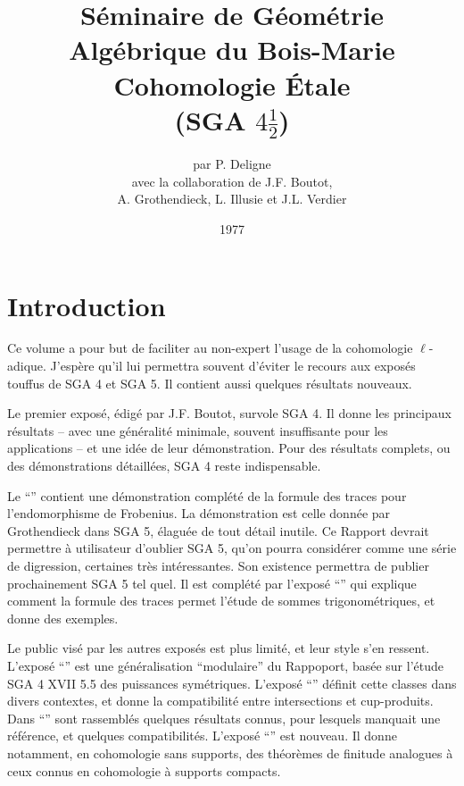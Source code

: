 \documentclass[oneside]{book}
\title{Séminaire de Géométrie Algébrique du Bois-Marie \\ \vspace{20pt}
Cohomologie Étale \\ \vspace{20pt}
(SGA $4\frac 1 2$)}
\author{par P. Deligne \vspace{10pt}\\ 
avec la collaboration de J.F. Boutot, \\ A. Grothendieck, L. Illusie et J.L. Verdier}
\date{1977}
\begin{document}
\maketitle












\chapter*{Introduction}

Ce volume a pour but de faciliter au non-expert l'usage de la 
cohomologie $\ell$-adique. J'espère qu'il lui permettra souvent d'éviter le 
recours aux exposés touffus de SGA 4 et SGA 5. Il contient aussi quelques 
résultats nouveaux. 

Le premier exposé, édigé par J.F. Boutot, survole SGA 4. Il donne les 
principaux résultats -- avec une généralité minimale, souvent 
insuffisante pour les applications -- et une idée de leur démonstration. Pour 
des résultats complets, ou des démonstrations détaillées, SGA 4 reste 
indispensable. 

Le ``'' contient une démonstration complété de 
la formule des traces pour l'endomorphisme de Frobenius. La démonstration est 
celle donnée par Grothendieck dans SGA 5, élaguée de tout détail inutile. Ce 
Rapport devrait permettre à utilisateur d'oublier SGA 5, qu'on pourra 
considérer comme une série de digression, certaines très intéressantes. Son 
existence permettra de publier prochainement SGA 5 tel quel. Il est complété 
par l'exposé ``'' qui explique comment la formule des traces permet 
l'étude de sommes trigonométriques, et donne des exemples. 

Le public visé par les autres exposés est plus limité, et leur style s'en 
ressent. L'exposé ``'' est une 
généralisation ``modulaire'' du Rappoport, basée sur l'étude SGA 4 XVII 5.5 des 
puissances symétriques. L'exposé ``'' 
définit cette classes dans divers contextes, et donne la compatibilité 
entre intersections et cup-produits. Dans ``'' sont rassemblés 
quelques résultats connus, pour lesquels manquait une référence, et quelques 
compatibilités. L'exposé ``'' 
est nouveau. Il donne notamment, en cohomologie sans supports, des théorèmes de 
finitude analogues à ceux connus en cohomologie à supports compacts. 
\end{document}
